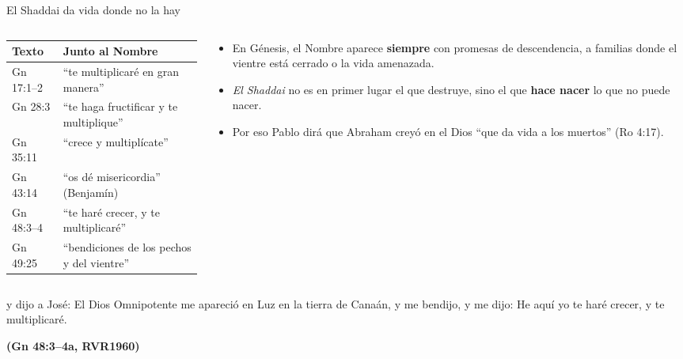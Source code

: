 \documentclass[hyperref={bookmarks=false},aspectratio=169]{beamer}
\newcommand{\fuente}[1]{\par\hfill{\upshape\bfseries\footnotesize\textcolor{azul}{#1}}}
\newcommand{\destacar}[1]{\textbf{\textcolor{azul}{#1}}}
\begin{document}
\begin{frame}{El Shaddai da vida donde no la hay}
\begin{columns}[c,onlytextwidth]
\begin{column}{0.50\textwidth}
\scriptsize\renewcommand{\arraystretch}{1.15}
\begin{tabular}{@{}>{\RaggedRight\arraybackslash}p{1.5cm}>{\RaggedRight\arraybackslash}p{4.3cm}@{}}
\toprule
\textbf{Texto} & \textbf{Junto al Nombre} \\ \midrule
Gn 17:1--2 & ``te multiplicaré en gran manera'' \\
Gn 28:3 & ``te haga fructificar y te multiplique'' \\
Gn 35:11 & ``crece y multiplícate'' \\
Gn 43:14 & ``os dé misericordia'' (Benjamín) \\
Gn 48:3--4 & ``te haré crecer, y te multiplicaré'' \\
Gn 49:25 & ``bendiciones de los pechos y del vientre'' \\
\bottomrule
\end{tabular}
\end{column}
\begin{column}{0.48\textwidth}\small
\begin{itemize}
\item En Génesis, el Nombre aparece \destacar{siempre} con promesas de descendencia, a familias donde el vientre está cerrado o la vida amenazada.
\item \emph{El Shaddai} no es en primer lugar el que destruye, sino el que \destacar{hace nacer} lo que no puede nacer.
\item Por eso Pablo dirá que Abraham creyó en el Dios ``que da vida a los muertos'' (Ro 4:17).
\end{itemize}
\end{column}
\end{columns}\par\medskip
\begin{cita}y dijo a José: El Dios Omnipotente me apareció en Luz en la tierra de Canaán, y me bendijo, y me dijo: He aquí yo te haré crecer, y te multiplicaré.\fuente{(Gn 48:3--4a, RVR1960)}\end{cita}
\end{frame}
\end{document}

